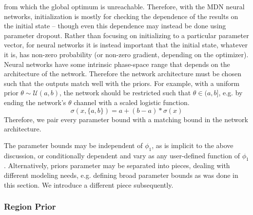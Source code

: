 \documentclass[twocolumn]{aastex631}
\newcommand{\mcal}[1]{\mathcal{#1}}
\begin{document}
            from which the global optimum is unreachable.  
            Therefore, with the MDN neural networks, initialization is mostly
            for checking the dependence of the results on the initial state --
            though even this dependence may instead be done using parameter
            dropout. Rather than focusing on initializing to a particular
            parameter vector, for neural networks it is instead important that
            the initial state, whatever it is, has non-zero probability (or
            non-zero gradient, depending on the optimizer).  Neural networks
            have some intrinsic phase-space range that depends on the
            architecture of the network. Therefore the network architecture must
            be chosen such that the outputs match well with the priors. For
            example, with a uniform prior $\theta \sim \mcal{U}(a,b)$, the
            network should be restricted such that $\theta \in (a, b]$, e.g. by
            ending the network's $\theta$ channel with a scaled logistic
            function.
            \begin{equation}\label{eq:scaled_logistic}
                  \sigma(x, \{a,b\}) = a + (b - a) * \sigma(x)
            \end{equation}
            Therefore, we pair every parameter bound with a matching bound in
            the network architecture.

            The parameter bounds may be independent of $\phi_1$, as is implicit
            to the above discussion, or conditionally dependent and vary as any
            user-defined function of $\phi_1$.  Alternatively, priors parameter
            may be separated into pieces, dealing with different modeling needs,
            e.g. defining broad parameter bounds as was done in this section.
            We introduce a different piece subsequently.


        \subsubsection{Region Prior} \label{sub:methods:priors:track_region_prior}
\end{document}
